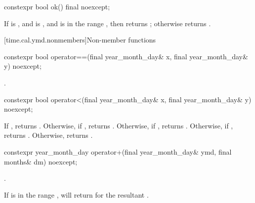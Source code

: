%
\begin{itemdecl}
constexpr bool ok() final noexcept;
\end{itemdecl}

\begin{itemdescr}
\pnum
\returns
If  is ,
and  is ,
and  is in the range ,
then returns ; otherwise returns .
\end{itemdescr}

[time.cal.ymd.nonmembers]{Non-member functions}

%
\begin{itemdecl}
constexpr bool operator==(final year_month_day& x, final year_month_day& y) noexcept;
\end{itemdecl}

\begin{itemdescr}
\pnum
\returns {}.
\end{itemdescr}

%
\begin{itemdecl}
constexpr bool operator<(final year_month_day& x, final year_month_day& y) noexcept;
\end{itemdecl}

\begin{itemdescr}
\pnum
\returns
If , returns .
Otherwise, if , returns .
Otherwise, if , returns .
Otherwise, if , returns .
Otherwise, returns .
\end{itemdescr}

%
\begin{itemdecl}
constexpr year_month_day operator+(final year_month_day& ymd, final months& dm) noexcept;
\end{itemdecl}

\begin{itemdescr}
\pnum
\returns {}.

\pnum
\begin{note}
If  is in the range ,
 will return  for
the resultant .
\end{note}
\end{itemdescr}


